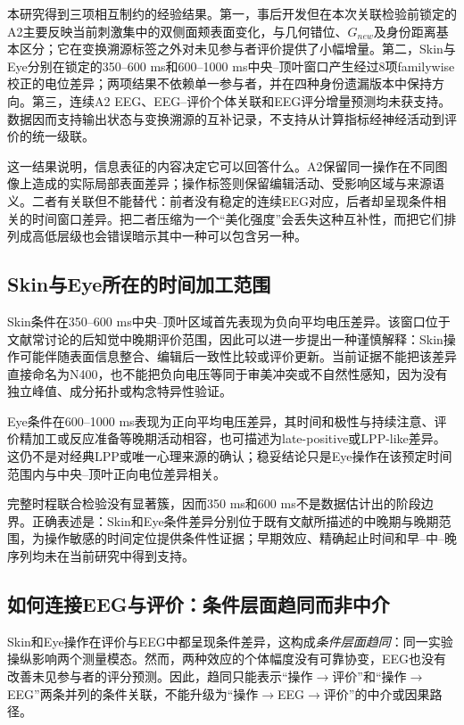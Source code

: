 \documentclass[preprint,12pt,authoryear]{elsarticle}
\begin{document}
本研究得到三项相互制约的经验结果。第一，事后开发但在本次关联检验前锁定的A2主要反映当前刺激集中的双侧面颊表面变化，与几何错位、$G_{new}$及身份距离基本区分；它在变换溯源标签之外对未见参与者评价提供了小幅增量。第二，Skin与Eye分别在锁定的350--600 ms和600--1000 ms中央--顶叶窗口产生经过8项familywise校正的电位差异；两项结果不依赖单一参与者，并在四种身份遗漏版本中保持方向。第三，连续A2 EEG、EEG--评价个体关联和EEG评分增量预测均未获支持。数据因而支持输出状态与变换溯源的互补记录，不支持从计算指标经神经活动到评价的统一级联。

这一结果说明，信息表征的内容决定它可以回答什么。A2保留同一操作在不同图像上造成的实际局部表面差异；操作标签则保留编辑活动、受影响区域与来源语义。二者有关联但不能替代：前者没有稳定的连续EEG对应，后者却呈现条件相关的时间窗口差异。把二者压缩为一个“美化强度”会丢失这种互补性，而把它们排列成高低层级也会错误暗示其中一种可以包含另一种。

\subsection{Skin与Eye所在的时间加工范围}

Skin条件在350--600 ms中央--顶叶区域首先表现为负向平均电压差异。该窗口位于文献常讨论的后知觉中晚期评价范围，因此可以进一步提出一种谨慎解释：Skin操作可能伴随表面信息整合、编辑后一致性比较或评价更新。当前证据不能把该差异直接命名为N400，也不能把负向电压等同于审美冲突或不自然性感知，因为没有独立峰值、成分拓扑或构念特异性验证。

Eye条件在600--1000 ms表现为正向平均电压差异，其时间和极性与持续注意、评价精加工或反应准备等晚期活动相容，也可描述为late-positive或LPP-like差异\citep{Revers2023,Han2022}。这仍不是对经典LPP或唯一心理来源的确认；稳妥结论只是Eye操作在该预定时间范围内与中央--顶叶正向电位差异相关。

完整时程联合检验没有显著簇，因而350 ms和600 ms不是数据估计出的阶段边界。正确表述是：Skin和Eye条件差异分别位于既有文献所描述的中晚期与晚期范围，为操作敏感的时间定位提供条件性证据；早期效应、精确起止时间和早--中--晚序列均未在当前研究中得到支持。

\subsection{如何连接EEG与评价：条件层面趋同而非中介}

Skin和Eye操作在评价与EEG中都呈现条件差异，这构成\emph{条件层面趋同}：同一实验操纵影响两个测量模态。然而，两种效应的个体幅度没有可靠协变，EEG也没有改善未见参与者的评分预测。因此，趋同只能表示“操作$\rightarrow$评价”和“操作$\rightarrow$EEG”两条并列的条件关联，不能升级为“操作$\rightarrow$EEG$\rightarrow$评价”的中介或因果路径。
\end{document}
